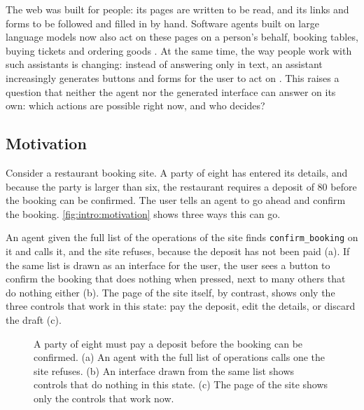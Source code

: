 

The web was built for people: its pages are written to be read, and its links and forms to be followed and filled in by hand.
Software agents built on large language models now also act on these pages on a person's behalf, booking tables, buying tickets and ordering goods \cite{yang2025agentic, ning2025survey}.
At the same time, the way people work with such assistants is changing: instead of answering only in text, an assistant increasingly generates buttons and forms for the user to act on \cite{googleGenUI2025, openaiApps2025}.
This raises a question that neither the agent nor the generated interface can answer on its own: which actions are possible right now, and who decides?

\subsection{Motivation}\label{sec:intro:motivation}

Consider a restaurant booking site.
A party of eight has entered its details, and because the party is larger than six, the restaurant requires a deposit of \texteuro{}80 before the booking can be confirmed.
The user tells an agent to go ahead and confirm the booking.
\autoref{fig:intro:motivation} shows three ways this can go.

An agent given the full list of the operations of the site finds \texttt{confirm\_booking} on it and calls it, and the site refuses, because the deposit has not been paid (a).
If the same list is drawn as an interface for the user, the user sees a button to confirm the booking that does nothing when pressed, next to many others that do nothing either (b).
The page of the site itself, by contrast, shows only the three controls that work in this state: pay the deposit, edit the details, or discard the draft (c).

\begin{figure}[htbp]
\centering

\caption{A party of eight must pay a deposit before the booking can be confirmed. (a) An agent with the full list of operations calls one the site refuses. (b) An interface drawn from the same list shows controls that do nothing in this state. (c) The page of the site shows only the controls that work now.}
\label{fig:intro:motivation}
\end{figure}

